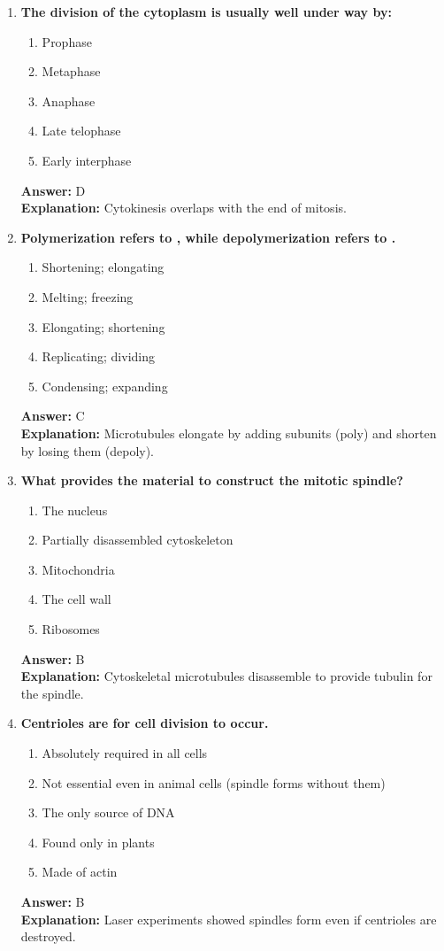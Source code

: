 \documentclass[11pt, a4paper]{article}
\begin{document}
\begin{enumerate}[leftmargin=*, label=\arabic*.]
\item \textbf{The division of the cytoplasm is usually well under way by:}
\begin{enumerate}[label=\Alph*.]
\item Prophase
\item Metaphase
\item Anaphase
\item Late telophase
\item Early interphase
\end{enumerate}
\textbf{Answer:} D \\
\textbf{Explanation:} Cytokinesis overlaps with the end of mitosis.

\item \textbf{Polymerization refers to \underline{\hspace{1cm}}, while depolymerization refers to \underline{\hspace{1cm}}.}
\begin{enumerate}[label=\Alph*.]
\item Shortening; elongating
\item Melting; freezing
\item Elongating; shortening
\item Replicating; dividing
\item Condensing; expanding
\end{enumerate}
\textbf{Answer:} C \\
\textbf{Explanation:} Microtubules elongate by adding subunits (poly) and shorten by losing them (depoly).

\item \textbf{What provides the material to construct the mitotic spindle?}
\begin{enumerate}[label=\Alph*.]
\item The nucleus
\item Partially disassembled cytoskeleton
\item Mitochondria
\item The cell wall
\item Ribosomes
\end{enumerate}
\textbf{Answer:} B \\
\textbf{Explanation:} Cytoskeletal microtubules disassemble to provide tubulin for the spindle.

\item \textbf{Centrioles are \underline{\hspace{1cm}} for cell division to occur.}
\begin{enumerate}[label=\Alph*.]
\item Absolutely required in all cells
\item Not essential even in animal cells (spindle forms without them)
\item The only source of DNA
\item Found only in plants
\item Made of actin
\end{enumerate}
\textbf{Answer:} B \\
\textbf{Explanation:} Laser experiments showed spindles form even if centrioles are destroyed.


\end{enumerate}
\end{document}
